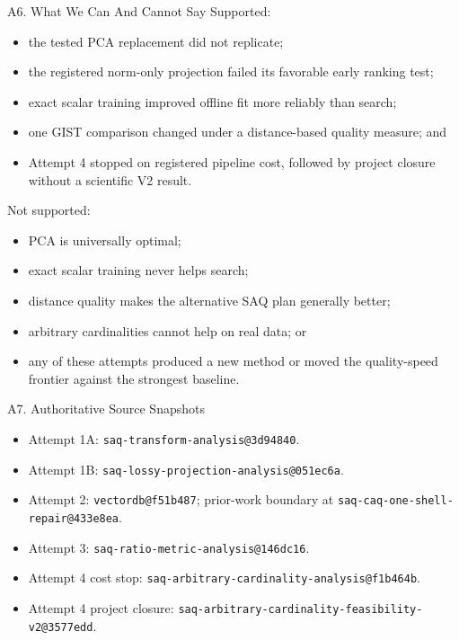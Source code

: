 \documentclass[
  ignorenonframetext,
  aspectratio=169,
]{beamer}
\providecommand{\tightlist}{%
  \setlength{\itemsep}{0pt}\setlength{\parskip}{0pt}}
\begin{document}
\begin{frame}{A6. What We Can And Cannot Say}
\protect{}\label{a6-what-we-can-and-cannot-say}
Supported:

\begin{itemize}
\tightlist
\item
  the tested PCA replacement did not replicate;
\item
  the registered norm-only projection failed its favorable early ranking
  test;
\item
  exact scalar training improved offline fit more reliably than search;
\item
  one GIST comparison changed under a distance-based quality measure;
  and
\item
  Attempt 4 stopped on registered pipeline cost, followed by project
  closure without a scientific V2 result.
\end{itemize}

Not supported:

\begin{itemize}
\tightlist
\item
  PCA is universally optimal;
\item
  exact scalar training never helps search;
\item
  distance quality makes the alternative SAQ plan generally better;
\item
  arbitrary cardinalities cannot help on real data; or
\item
  any of these attempts produced a new method or moved the quality-speed
  frontier against the strongest baseline.
\end{itemize}
\end{frame}

\begin{frame}[fragile]{A7. Authoritative Source Snapshots}
\protect{}\label{a7-authoritative-source-snapshots}
\begin{itemize}
\tightlist
\item
  Attempt 1A: \texttt{saq-transform-analysis@3d94840}.
\item
  Attempt 1B: \texttt{saq-lossy-projection-analysis@051ec6a}.
\item
  Attempt 2: \texttt{vectordb@f51b487}; prior-work boundary at
  \texttt{saq-caq-one-shell-repair@433e8ea}.
\item
  Attempt 3: \texttt{saq-ratio-metric-analysis@146dc16}.
\item
  Attempt 4 cost stop:
  \texttt{saq-arbitrary-cardinality-analysis@f1b464b}.
\item
  Attempt 4 project closure:
  \texttt{saq-arbitrary-cardinality-feasibility-v2@3577edd}.
\end{itemize}
\end{frame}
\end{document}
